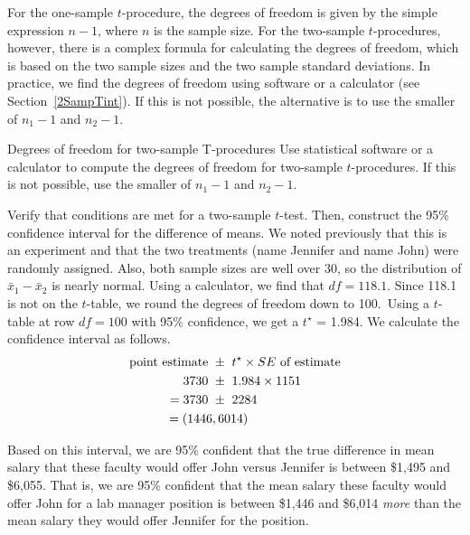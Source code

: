 For the one-sample $t$-procedure, the degrees of freedom is given by the simple expression $n-1$, where $n$ is the sample size.  For the two-sample $t$-procedures, however, there is a complex formula for calculating the degrees of freedom, which is based on the two sample sizes and the two sample standard deviations.  In practice, we find the degrees of freedom using software or a calculator (see Section~\ref{2SampTint}).  If this is not possible, the alternative is to use the smaller of $n_1-1$ and $n_2-1$.

\begin{onebox}
{Degrees of freedom for two-sample T-procedures}
Use statistical software or a calculator to compute the degrees of freedom for two-sample \mbox{$t$-procedures}.  If this is not possible, use the smaller of $n_1-1$ and $n_2-1$.
\end{onebox}

\begin{examplewrap}
\begin{nexample}{Verify that conditions are met for a two-sample $t$-test.  Then, construct the 95\% confidence interval for the difference of means.}
We noted previously that this is an experiment and that the two treatments (name Jennifer and name John) were randomly assigned.  Also, both sample sizes are well over 30, so the distribution of $\bar{x}_1-\bar{x}_2$ is nearly normal.  Using a calculator, we find that $df= 118.1$.  Since 118.1 is not on the $t$-table, we round the degrees of freedom down to 100.\footnotemark  \ Using a $t$-table at row $df=100$ with 95\% confidence, we get a $t^{\star}$ = 1.984. We calculate the confidence interval as follows. 
\begin{align*}
\text{point estimate } &\pm \ t^{\star}\times SE \text{ of estimate}\\
3730\ &\pm \ 1.984\times 1151{}\\
= 3730\ &\pm \ 2284\\
= (1446&, 6014)
\end{align*}
\end{nexample}
\end{examplewrap}

Based on this interval, we are 95\% confident that the true difference in mean salary that these faculty would offer John versus Jennifer is between \$1,495 and \$6,055.  That is, we are 95\% confident that the mean salary these faculty would offer John for a lab manager position is between \$1,446 and \$6,014 \emph{more} than the mean salary they would offer Jennifer for the position.

